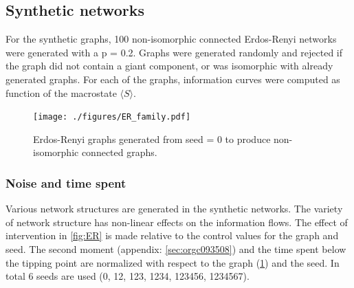 \documentclass[a4paper, 11pt, twocolumn]{article}
\begin{document}
\subsection{Synthetic networks}
\label{sec:org280a93f}
For  the  synthetic  graphs,  100  non-isomorphic  connected
Erdos-Renyi networks were  generated with a p  = 0.2. Graphs
were generated  randomly and rejected  if the graph  did not
contain a  giant component,  or was isomorphic  with already
generated graphs. For each of the graphs, information curves
were computed as function of the macrostate \(\langle S \rangle\).

\begin{figure}[htbp]
\centering
\texttt{[image: ./figures/ER\_family.pdf]}
\caption{\label{fig:ER_family}Erdos-Renyi graphs generated from seed = 0 to produce non-isomorphic connected graphs.}
\end{figure}

\subsubsection{Noise and time spent}
\label{sec:org80c62b8}
Various network  structures are  generated in  the synthetic
networks. The  variety of  network structure  has non-linear
effects on the information flows. The effect of intervention
in \cref{fig:ER} is made relative  to the control values for
the  graph and  seed. The  second moment  (appendix: \ref{sec:orgc093508}) and the time spent below the tipping
point   are   normalized   with   respect   to   the   graph
(\cref{fig:ER_family}) and  the seed.  In total 6  seeds are
used (0, 12, 123, 1234, 123456, 1234567).
\end{document}
